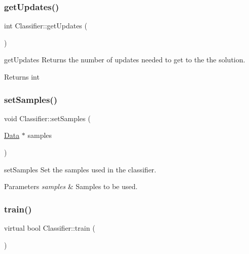 \subsubsection{\texorpdfstring{get\+Updates()}{getUpdates()}}
{\footnotesize\ttfamily int Classifier\+::get\+Updates (\begin{DoxyParamCaption}{ }\end{DoxyParamCaption})}



get\+Updates Returns the number of updates needed to get to the the solution. 

\begin{DoxyReturn}{Returns}
int 
\end{DoxyReturn}
\mbox{\label{class_classifier_a4b16736670cba8f4c8397b6a90c8c799}} 
\subsubsection{\texorpdfstring{set\+Samples()}{setSamples()}}
{\footnotesize\ttfamily void Classifier\+::set\+Samples (\begin{DoxyParamCaption}\item[{\hyperlink{class_data}{Data} $\ast$}]{samples }\end{DoxyParamCaption})\hspace{0.3cm}{\ttfamily [virtual]}}



set\+Samples Set the samples used in the classifier. 


\begin{DoxyParams}{Parameters}
{\em samples} & Samples to be used. \\
\hline
\end{DoxyParams}
\mbox{\label{class_classifier_a2306a5de27555ab093593ac9642bc7d9}} 
\subsubsection{\texorpdfstring{train()}{train()}}
{\footnotesize\ttfamily virtual bool Classifier\+::train (\begin{DoxyParamCaption}{ }\end{DoxyParamCaption})\hspace{0.3cm}{\ttfamily [pure virtual]}}



